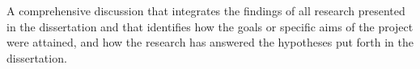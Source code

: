 A comprehensive discussion that integrates the findings of all research presented
in the dissertation and that identifies how the goals or specific aims of the project
were attained, and how the research has answered the hypotheses put forth in the
dissertation.
